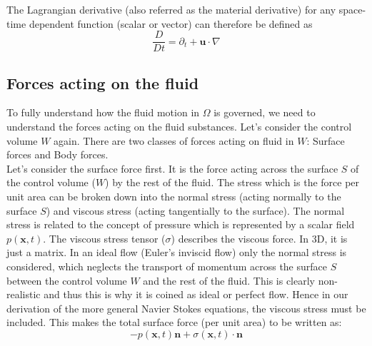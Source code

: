 The Lagrangian derivative (also referred as the material derivative) for any space-time dependent function (scalar or vector) can therefore be defined as \cite{chorin1968numerical}
\begin{equation}
\dfrac{D}{D t} = \partial_t + \textbf{u} \cdot \nabla
\end{equation}

\subsection{Forces acting on the fluid}
To fully understand how the fluid motion in $\Omega$ is governed, we need to understand the forces acting on the fluid substances. Let's consider the control volume $W$ again. There are two classes of forces acting on fluid in $W$: Surface forces and Body forces.\\

Let's consider the surface force first. It is the force acting across the surface $S$ of the control volume ($W$) by the rest of the fluid. The stress which is the force per unit area can be broken down into the normal stress (acting normally to the surface $S$) and viscous stress (acting tangentially to the surface). The normal stress is related to the concept of pressure which is represented by a scalar field $p(\textbf{x},t)$. The viscous stress tensor ($\textbf{$\sigma$}$) describes the viscous force. In 3D, it is just a matrix. In an ideal flow (Euler's inviscid flow) only the normal stress is considered, which neglects the transport of momentum across the surface $S$ between the control volume $W$ and the rest of the fluid. This is clearly non-realistic and thus this is why it is coined as ideal or perfect flow. Hence in our derivation of the more general Navier Stokes equations, the viscous stress must be included. This makes the total surface force (per unit area) to be written as:
\begin{equation}
- p(\textbf{x},t) \textbf{n} + \textbf{$\sigma$} (\textbf{x},t)\cdot \textbf{n}
\end{equation}

